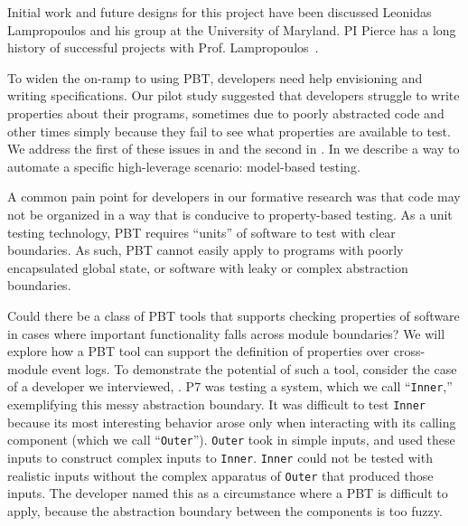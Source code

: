 Initial work and future
designs for this project have been discussed Leonidas
Lampropoulos and his group at the University of Maryland. PI Pierce has a long
history of successful projects with Prof.
Lampropoulos~\cite[etc.]{LuckPOPL,goldstein2021dojudgeatest,lampropoulos_coverage_2019,Lampropoulos&18,OLDlampropoulos19fuzzchick}.

%
%
To widen the on-ramp to using PBT, developers need help envisioning and writing
specifications. Our pilot study suggested that developers struggle to write
properties about their programs, sometimes due to poorly abstracted code and
other times simply because they fail to see what properties are available to
test. We address the first of these issues in  and
the second in .
%
In  we describe a way to automate a
specific high-leverage scenario: model-based testing.

A common pain point for developers in our formative research
was that code may not be organized in a way that is conducive to property-based
testing. As a unit testing technology, PBT requires ``units'' of software to
test with clear boundaries. As such, PBT cannot easily apply to programs with
poorly encapsulated global state, or software with leaky or complex abstraction
boundaries.

Could there be a class of PBT tools that supports checking properties of
software in cases where important functionality falls across module boundaries?
We will explore how a PBT tool can support the definition of properties over
cross-module event logs. To demonstrate the potential of such a tool, consider
the case of a developer we interviewed, . P7 was testing
a system, which we call ``\lstinline{Inner},'' exemplifying this messy
abstraction
boundary. It was difficult to test \lstinline{Inner} because
its most interesting behavior arose only when interacting with its calling
component (which we call ``\lstinline{Outer}'').
\lstinline{Outer} took in simple inputs, and used these inputs to construct
complex inputs to \lstinline{Inner}. \lstinline{Inner} could not be tested with
realistic inputs without the complex apparatus of \lstinline{Outer} that
produced those inputs. The developer named this as a circumstance where a
PBT is difficult to apply, because the abstraction boundary between the
components is too fuzzy.

